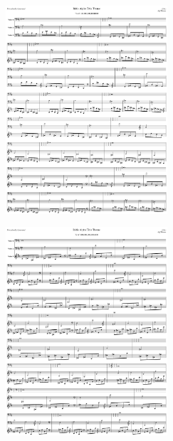 \begin{figure}[H]                                             
{                                                             
  \setlength{\tabcolsep}{3.0pt}                               
  \setlength\cmidrulewidth{\heavyrulewidth} %
    \begin{subfigure}{0.5\textwidth}                            
  \includegraphics[width=6cm]{music/title_no_71_page_1001.png}%
    \end{subfigure}                                             
  \begin{subfigure}{0.5\textwidth}                            
  \includegraphics[width=6cm]{music/title_no_72_page_1001.png}%
    \end{subfigure}                                             
}                                                             
\end{figure}                                                  


